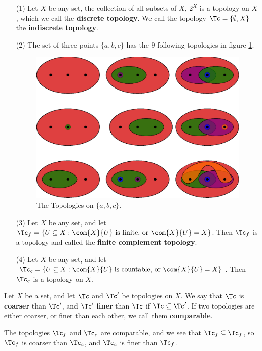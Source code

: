 \begin{example}
    \begin{enumerate}
        \item[(1)] Let $X$ be any set, the collection of all subsets of  $X$,  $2^X$ is a topology
            on $X$, which we call the \textbf{discrete topology}. We call the topology
            $\Tc=
            \{\emptyset, X\}$ the \textbf{indiscrete topology}.

        \item[(2)] The set of three points $\{a, b, c\}$ has the  $9$ following
            topologies
            in figure \ref{fig1.1}.
            \begin{figure}[h]
                \centering
                \includegraphics[scale = 0.5]{Figures/Chapter1/three_point_topology.eps}
                \caption{The Topologies on $\{a, b, c\}$.}
                \label{fig1.1}
            \end{figure}

        \item[(3)] Let $X$ be any set, and let  $\Tc_f=\{U \subseteq X: \com{X}{U}
                \text{ is finite, or } \com{X}{U}=X\}$. Then  $\Tc_f$ is a
                topology and called the \textbf{finite complement topology}.

        \item[(4)] Let $X$ be any set, and let  $\Tc_c=\{U \subseteq X: \com{X}{U}
                \text{ is countable, or } \com{X}{U}=X\}$. Then  $\Tc_c$ is a
                topology on $X$.
    \end{enumerate}
\end{example}

\begin{definition}
    Let $X$ be a set, and let $\Tc$ and  $\Tc'$ be topologies on  $X$. We say that
    $\Tc$ is  \textbf{coarser} than $\Tc'$, and $\Tc'$ \textbf{finer} than $\Tc$ if
    $\Tc \subseteq \Tc'$.
    If two topologies are either coarser, or finer than each other, we call them
    \textbf{comparable}.
\end{definition}

\begin{example}
    The topologies $\Tc_f$ and  $\Tc_c$ are comparable, and we see that  $\Tc_f
    \subseteq \Tc_f$, so $\Tc_f$ is coarser than  $\Tc_c$, and  $\Tc_c$ is finer than
    $\Tc_f$.
\end{example}
